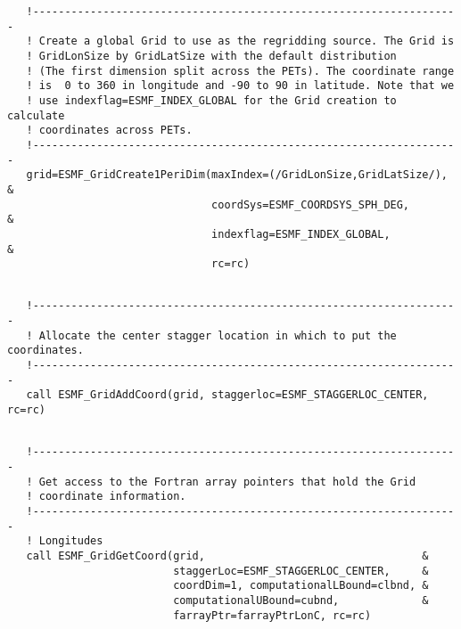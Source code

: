 
 \begin{verbatim}
   !-------------------------------------------------------------------
   ! Create a global Grid to use as the regridding source. The Grid is 
   ! GridLonSize by GridLatSize with the default distribution 
   ! (The first dimension split across the PETs). The coordinate range
   ! is  0 to 360 in longitude and -90 to 90 in latitude. Note that we 
   ! use indexflag=ESMF_INDEX_GLOBAL for the Grid creation to calculate
   ! coordinates across PETs.
   !-------------------------------------------------------------------
   grid=ESMF_GridCreate1PeriDim(maxIndex=(/GridLonSize,GridLatSize/), &
                                coordSys=ESMF_COORDSYS_SPH_DEG,       &
                                indexflag=ESMF_INDEX_GLOBAL,          &
                                rc=rc)
 
\end{verbatim}
 

 \begin{verbatim}
   !-------------------------------------------------------------------
   ! Allocate the center stagger location in which to put the coordinates. 
   !-------------------------------------------------------------------
   call ESMF_GridAddCoord(grid, staggerloc=ESMF_STAGGERLOC_CENTER, rc=rc)
 
\end{verbatim}
 

 \begin{verbatim}
   !-------------------------------------------------------------------
   ! Get access to the Fortran array pointers that hold the Grid 
   ! coordinate information.
   !------------------------------------------------------------------- 
   ! Longitudes 
   call ESMF_GridGetCoord(grid,                                  &
                          staggerLoc=ESMF_STAGGERLOC_CENTER,     &
                          coordDim=1, computationalLBound=clbnd, &
                          computationalUBound=cubnd,             &
                          farrayPtr=farrayPtrLonC, rc=rc)
 
\end{verbatim}
 

